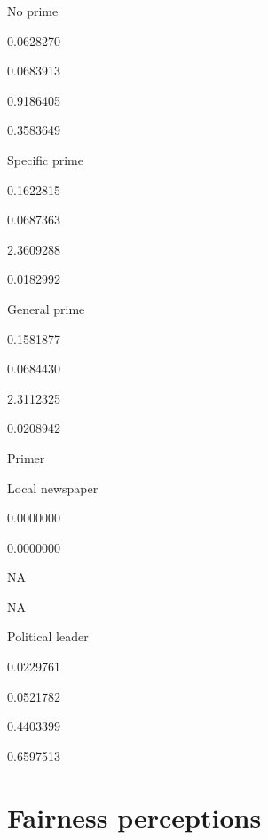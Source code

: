 \documentclass[]{book}
\begin{document}
No prime

0.0628270

0.0683913

0.9186405

0.3583649

Specific prime

0.1622815

0.0687363

2.3609288

0.0182992

General prime

0.1581877

0.0684430

2.3112325

0.0208942

Primer

Local newspaper

0.0000000

0.0000000

NA

NA

Political leader

0.0229761

0.0521782

0.4403399

0.6597513

\section{Fairness perceptions}\label{fairness-perceptions}
\end{document}

